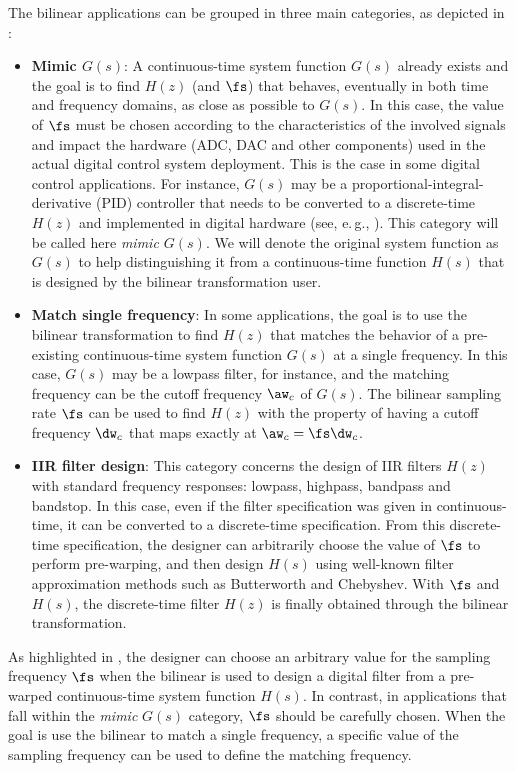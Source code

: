 The bilinear applications can be grouped in three main categories, as depicted in :
\begin{itemize}
\item \textbf{Mimic $G(s)$}: A continuous-time system function $G(s)$ already exists and the goal is to find $H(z)$ (and $\fs$)
that behaves, eventually in both time and frequency domains, as close as possible to $G(s)$. In this case, the value of $\fs$ must be chosen according to the characteristics of the involved signals and impact the hardware (ADC, DAC and other components) used in the actual digital control system deployment. 
This is the case in some digital control applications. For instance, $G(s)$ may be a proportional-integral-derivative (PID) controller that needs to be converted to a discrete-time $H(z)$ and implemented in digital hardware (see, e.\,g., ). 
This category will be
called here \emph{mimic $G(s)$}. We will denote the original system function as $G(s)$ to help distinguishing it from a continuous-time function $H(s)$ that is
designed by the bilinear transformation user.
\item \textbf{Match single frequency}: In some applications, the goal is to use the bilinear transformation
to find $H(z)$ that matches the behavior of a pre-existing continuous-time system function $G(s)$ at a single frequency.
In this case, $G(s)$ may be a lowpass filter, for instance, and the matching frequency can be the cutoff frequency $\aw_c$ of $G(s)$.
The bilinear sampling rate $\fs$ can be used to find $H(z)$ with the property of having a cutoff frequency
$\dw_c$ that maps exactly at $\aw_c = \fs \dw_c$.
\item \textbf{IIR filter design}: This category concerns the design of IIR filters $H(z)$ with
standard frequency responses: lowpass, highpass, bandpass and bandstop. In this case, even
if the filter specification was given in continuous-time, it can be converted to a discrete-time specification.
From this discrete-time specification, the designer can arbitrarily
choose the value of $\fs$ to perform pre-warping, and then design $H(s)$ using well-known filter approximation methods
such as Butterworth and Chebyshev. With $\fs$ and $H(s)$, the discrete-time filter $H(z)$
is finally obtained through the bilinear transformation.
\end{itemize}

As highlighted in , the designer can choose an arbitrary value for the sampling frequency $\fs$ when the bilinear is used to design a digital filter from a pre-warped continuous-time system function $H(s)$. In contrast, in applications that fall within the \emph{mimic} $G(s)$ category, $\fs$ should be carefully chosen. When the
goal is use the bilinear to match a single frequency, a specific value of the sampling frequency can be used to
define the matching frequency.


